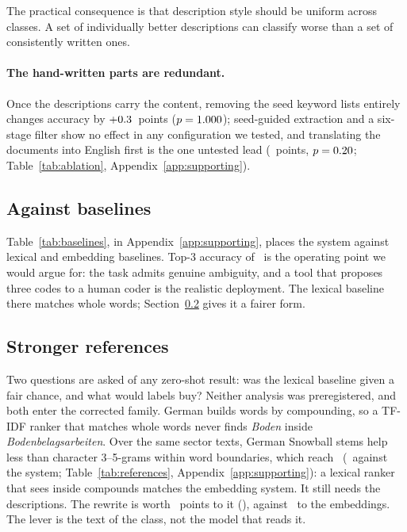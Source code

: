 \documentclass[11pt]{article}
\begin{document}
The practical consequence is that description style should be uniform across
classes. A set of individually better descriptions can classify worse than a set
of consistently written ones.

\paragraph{The hand-written parts are redundant.}
Once the descriptions carry the content, removing the seed keyword lists
entirely changes accuracy by $+0.3$~points
($p = 1.000$); seed-guided extraction and a six-stage filter show no
effect in any configuration we tested, and translating the documents into
English first is the one untested lead
(\TranslateGain~points, $p = 0.20$; Table~\ref{tab:ablation}, Appendix~\ref{app:supporting}).

\subsection{Against baselines}

Table~\ref{tab:baselines}, in Appendix~\ref{app:supporting}, places the system
against lexical and embedding baselines. Top-3 accuracy of \OursTopThree\ is the operating point we would
argue for: the task admits genuine ambiguity, and a tool that proposes three
codes to a human coder is the realistic deployment. The lexical baseline there
matches whole words; Section~\ref{sec:references} gives it a fairer form.

\subsection{Stronger references}
\label{sec:references}



Two questions are asked of any zero-shot result: was the lexical baseline given
a fair chance, and what would labels buy? Neither analysis was preregistered,
and both enter the corrected family. German builds words by compounding, so a
TF-IDF ranker that matches whole words never finds \emph{Boden} inside
\emph{Bodenbelagsarbeiten}. Over the same sector texts, German Snowball stems help
less than character 3--5-grams within word boundaries, which reach
\RefCharTopOne\ (\RefCharPStat\ against the system; Table~\ref{tab:references},
Appendix~\ref{app:supporting}):
a lexical ranker that sees inside compounds matches the embedding system. It
still needs the descriptions. The rewrite is worth \RefCharDescGain~points to it
(\RefCharDescPStat), against \RefEmbedDescGain\ to the embeddings. The lever is
the text of the class, not the model that reads it.
\end{document}
